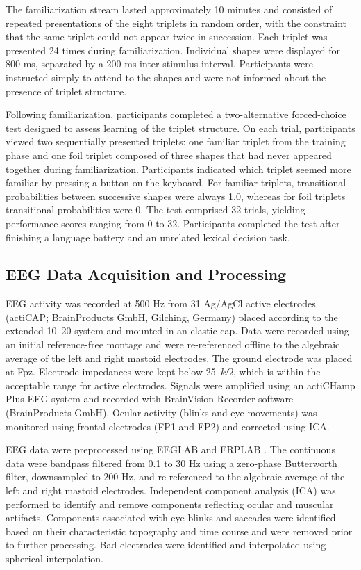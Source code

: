 The familiarization stream lasted approximately 10 minutes and consisted of repeated presentations of the eight triplets in random order, with the constraint that the same triplet could not appear twice in succession. Each triplet was presented 24 times during familiarization. Individual shapes were displayed for 800 ms, separated by a 200 ms inter-stimulus interval. Participants were instructed simply to attend to the shapes and were not informed about the presence of triplet structure.

Following familiarization, participants completed a two-alternative forced-choice test designed to assess learning of the triplet structure. On each trial, participants viewed two sequentially presented triplets: one familiar triplet from the training phase and one foil triplet composed of three shapes that had never appeared together during familiarization. Participants indicated which triplet seemed more familiar by pressing a button on the keyboard. For familiar triplets, transitional probabilities between successive shapes were always 1.0, whereas for foil triplets transitional probabilities were 0. The test comprised 32 trials, yielding performance scores ranging from 0 to 32. Participants completed the test after finishing a language battery and an unrelated lexical decision task.

\subsection*{EEG Data Acquisition and Processing}
EEG activity was recorded at 500 Hz from 31 Ag/AgCl active electrodes (actiCAP; BrainProducts GmbH, Gilching, Germany) placed according to the extended 10--20 system and mounted in an elastic cap. Data were recorded using an initial reference-free montage and were re-referenced offline to the algebraic average of the left and right mastoid electrodes. The ground electrode was placed at Fpz. Electrode impedances were kept below 25~$k\Omega$, which is within the acceptable range for active electrodes. Signals were amplified using an actiCHamp Plus EEG system and recorded with BrainVision Recorder software (BrainProducts GmbH). Ocular activity (blinks and eye movements) was monitored using frontal electrodes (FP1 and FP2) and corrected using ICA.

EEG data were preprocessed using EEGLAB \cite{delormeEEGLABOpenSource2004} and ERPLAB \cite{lopez-calderonERPLABOpensourceToolbox2014}. The continuous data were bandpass filtered from 0.1 to 30 Hz using a zero-phase Butterworth filter, downsampled to 200 Hz, and re-referenced to the algebraic average of the left and right mastoid electrodes. Independent component analysis (ICA) was performed to identify and remove components reflecting ocular and muscular artifacts. Components associated with eye blinks and saccades were identified based on their characteristic topography and time course and were removed prior to further processing. Bad electrodes were identified and interpolated using spherical interpolation.

